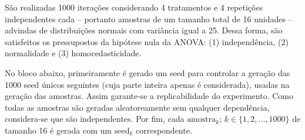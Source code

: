 \documentclass[
]{article}
\begin{document}
São realizadas 1000 iterações considerando 4 tratamentos e 4 repetições
independentes cada -- portanto amostras de um tamanho total de 16
unidades -- advindas de distribuições normais com variância igual a 25.
Dessa forma, são satisfeitos os pressupostos da hipótese nula da ANOVA:
(1) independência, (2) normalidade e (3) homocedasticidade.

No bloco abaixo, primeiramente é gerado um seed para controlar a geração
das 1000 seed únicos seguintes (cuja parte inteira apenas é
considerada), usadas na geração das amostras. Assim garante-se a
replicabilidade do experimento. Como todas as amostras são geradas
aleatoreamente sem qualquer dependência, considera-se que são
independentes. Por fim, cada
\(\text{amostra}_k; \, k \in \{1, 2, ..., 1000\}\) de tamanho 16 é
gerada com um \(\text{seed}_k\) correspondente.
\end{document}
